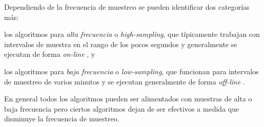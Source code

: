 Dependiendo de la frecuencia de muestreo se pueden identificar dos categorías más: \begin{enumerate*}[1)] \item los algoritmos para \emph{alta frecuencia} o \emph{high-sampling}, que típicamente trabajan con intervalos de muestra en el rango de los pocos segundos y generalmente se ejecutan de forma \emph{on-line} \cite{greenfeld2002matching,quddus2003general,quddus2006high}, y \item los algoritmos para \emph{baja frecuencia} o \emph{low-sampling},  que funcionan para intervalos de muestreo de varios minutos y se ejecutan generalmente de forma \emph{off-line} \cite{lou2009map,yuan2010interactive}. \end{enumerate*} En general todos los algoritmos pueden ser alimentados con muestras de alta o baja frecuencia pero ciertos algoritmos dejan de ser efectivos a medida que disminuye la frecuencia de muestreo.
